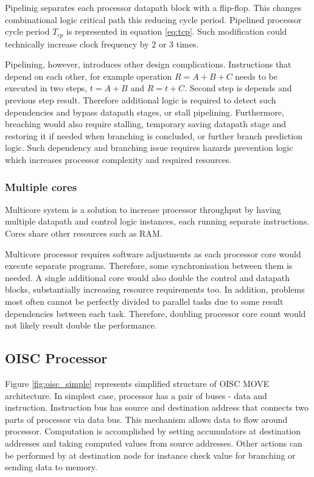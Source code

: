 Pipelinig separates each processor datapath block with a flip-flop. This changes combinational logic critical path this reducing cycle period. Pipelined processor cycle period $T_{cp}$ is represented in equation \ref{eq:tcp}. Such modification could technically increase clock frequency by 2 or 3 times.

Pipelining, however, introduces other design complications. Instructions that depend on each other, for example operation $R = A + B + C$ needs to be executed in two steps, $t = A + B$ and $R = t + C$. Second step is depends and previous step result. Therefore additional logic is required to detect such dependencies and bypass datapath stages, or stall pipelining. Furthermore, breaching would also require stalling, temporary saving datapath stage and restoring it if needed when branching is concluded, or further branch prediction logic. Such dependency and branching issue requires hazards prevention logic which increases processor complexity and required resources. 

\subsubsection{Multiple cores}

Multicore system is a solution to increase processor throughput by having multiple datapath and control logic instances, each running separate instructions. Cores share other resources such as RAM.

Multicore processor requires software adjustments as each processor core would execute separate programs. Therefore, some synchronisation between them is needed. A single additional core would also double the control and datapath blocks, substantially increasing resource requirements too. In addition, problems most often cannot be perfectly divided to parallel tasks due to some result dependencies between each task. Therefore, doubling processor core count would not likely result double the performance. 

\subsection{OISC Processor}

Figure \ref{fig:oisc_simple} represents simplified structure of OISC MOVE architecture. In simplest case, processor has a pair of buses - data and instruction. Instruction bus has source and destination address that connects two parts of processor via data bus. This mechanism allows data to flow around processor. Computation is accomplished by setting accumulators at destination addresses and taking computed values from source addresses. Other actions can be performed by at destination node for instance check value for branching or sending data to memory. 

\vfill



